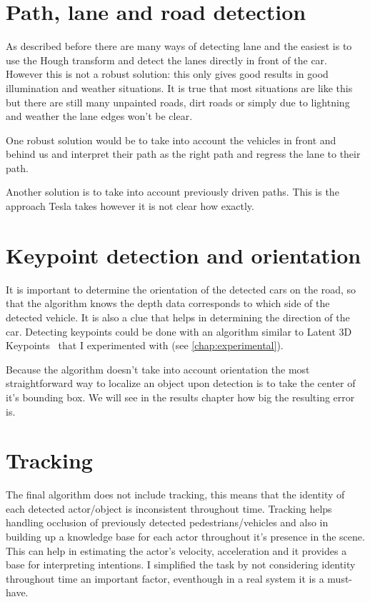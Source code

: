 \section{Path, lane and road detection}

As described before there are many ways of detecting lane and the easiest is to
use the Hough transform and detect the lanes directly in front of the car.
However this is not a robust solution: this only gives good results in good
illumination and weather situations. It is true that most situations are like
this but there are still many unpainted roads, dirt roads or simply due to
lightning and weather the lane edges won't be clear.

One robust solution would be to take into account the vehicles in front and
behind us and interpret their path as the right path and regress the lane to
their path. 

Another solution is to take into account previously driven paths. This is the
approach Tesla takes however it is not clear how exactly.

\section{Keypoint detection and orientation}

It is important to determine the orientation of the detected cars on the road,
so that the algorithm knows the depth data corresponds to which side of the
detected vehicle. It is also a clue that helps in determining the direction
of the car. Detecting keypoints could be done with an algorithm similar to Latent 3D
Keypoints~\cite{suwajanakorn_discovery_2018} that I experimented with (see \autoref{chap:experimental}).

Because the algorithm doesn't take into account orientation the most
straightforward way to localize an object upon detection is to take the center
of it's bounding box. We will see in the results chapter how big the resulting error is.

\section{Tracking}

The final algorithm does not include tracking, this means that the identity of
each detected actor/object is inconsistent throughout time. Tracking helps
handling occlusion of previously detected pedestrians/vehicles and also in
building up a knowledge base for each actor throughout it's presence in the
scene. This can help in estimating the actor's velocity, acceleration and it
provides a base for interpreting intentions. I simplified the task by not
considering identity throughout time an important factor, eventhough in a real
system it is a must-have.

